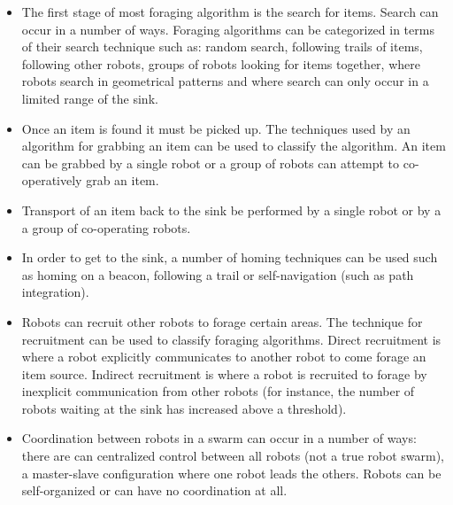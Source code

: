 \begin{itemize}
\item The first stage of most foraging algorithm is the search for items. Search can occur in a number of ways. Foraging algorithms can be categorized in terms of their search technique such as: random search, following trails of items, following other robots, groups of robots looking for items together, where robots search in geometrical patterns and where search can only occur in a limited range of the sink.
\item Once an item is found it must be picked up. The techniques used by an algorithm for grabbing an item can be used to classify the algorithm. An item can be grabbed by a single robot or a group of robots can attempt to co-operatively grab an item.
\item Transport of an item back to the sink be performed by a single robot or by a a group of co-operating robots.
\item In order to get to the sink, a number of homing techniques can be used such as homing on a beacon, following a trail or self-navigation (such as path integration).
\item Robots can recruit other robots to forage certain areas. The technique for recruitment can be used to classify foraging algorithms. Direct recruitment is where a robot explicitly communicates to another robot to come forage an item source. Indirect recruitment is where a robot is recruited to forage by inexplicit communication from other robots (for instance, the number of robots waiting at the sink has increased above a threshold). 
\item Coordination between robots in a swarm can occur in a number of ways: there are can centralized control between all robots (not a true robot swarm), a master-slave configuration where one robot leads the others. Robots can be self-organized or can have no coordination at all. 
\end{itemize}

